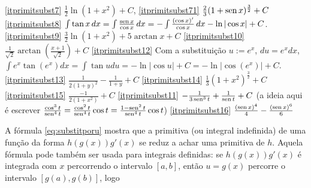 \begin{exo}
\begin{sol}
\eqref{itprimitsubst7} $\tfrac12\ln(1+x^2)+C$,
\eqref{itprimitsubst71} $\frac{2}{3}(1+\operatorname{sen} x)^{\frac{3}{2}}+C$
\eqref{itprimitsubst8} $\int \tan x\,dx=\int\frac{\operatorname{sen} x}{\cos
x}\,dx=-\int\frac{(\cos x)'}{\cos
x}\,dx -\ln|\cos x|+C$.
\eqref{itprimitsubst9} $\tfrac32 \ln(1+x^2)+5\arctan x+C$
\eqref{itprimitsubst10} $\frac{1}{\sqrt{2}}\arctan(\frac{x+1}{\sqrt{2}})+C$
\eqref{itprimitsubst12} 
Com a substituição $u:=e^x$, $du=e^x dx$, 
$\int e^x\tan(e^x)dx=\int \tan u du=-\ln|\cos u|+C=-\ln|\cos(e^x)|+C$.
\eqref{itprimitsubst13} $\frac{1}{2(1+y)^2}-\frac{1}{1+y}+C$
\eqref{itprimitsubst14} $\frac{1}{3}(1+x^2)^{\frac{3}{2}}+C$
\eqref{itprimitsubst15} $\frac{-1}{2(1+x^2)}+C$
\eqref{itprimitsubst11} $-\frac{1}{3\operatorname{sen}^3t}+\frac{1}{\operatorname{sen} t}+C$ (a ideia aqui
é escrever $\frac{\cos^3t}{\operatorname{sen}^4t}=\frac{\cos^2t}{\operatorname{sen}^4t}\cos
t=\frac{1-\operatorname{sen}^2t}{\operatorname{sen}^4t}\cos t$)
\eqref{itprimitsubst16} $\frac{(\operatorname{sen} x)^4}{4}-\frac{(\operatorname{sen} x)^6}{6}$
\end{sol}
\end{exo}

A fórmula \eqref{eq:substitporu} mostra que a primitiva (ou integral 
indefinida) de uma função 
da forma $h(g(x))g'(x)$ se reduz a achar uma primitiva de $h$.
Aquela fórmula pode também ser usada para integrais definidas: se
$h(g(x))g'(x)$ é integrada com $x$ percorrendo o intervalo $[a,b]$, então
$u=g(x)$ percorre o intervalo $[g(a),g(b)]$, logo


